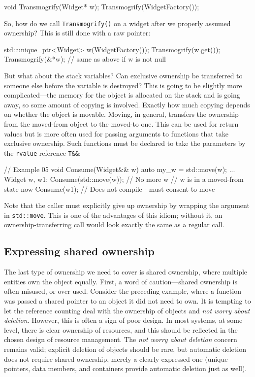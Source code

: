 \begin{code}
void Transmogrify(Widget* w);
Transmogrify(WidgetFactory());
\end{code}

So, how do we call \texttt{Transmogrify()} on a widget after we properly assumed ownership? This is still done with a raw pointer:

\begin{code}
std::unique_ptr<Widget> w(WidgetFactory());
Transmogrify(w.get());
Transmogrify(&*w);     // same as above if w is not null
\end{code}

But what about the stack variables? Can exclusive ownership be transferred to someone else before the variable is destroyed? This is going to be slightly more complicated---the memory for the object is allocated on the stack and is going away, so some amount of copying is involved. Exactly how much copying depends on whether the object is movable. Moving, in general, transfers the ownership from the moved-from object to the moved-to one. This can be used for return values but is more often used for passing arguments to functions that take exclusive ownership. Such functions must be declared to take the parameters by the \texttt{rvalue} reference \texttt{T\&\&}:

\begin{code}
// Example 05
void Consume(Widget&& w) {
  auto my_w = std::move(w);
    ...
}
Widget w, w1;
Consume(std::move(w));    // No more w
// w is in a moved-from state now
Consume(w1);    // Does not compile - must consent to move
\end{code}

Note that the caller must explicitly give up ownership by wrapping the argument in \texttt{std::move}. This is one of the advantages of this idiom; without it, an ownership-transferring call would look exactly the same as a regular call.

\subsection{Expressing shared ownership}

The last type of ownership we need to cover is shared ownership, where multiple entities own the object equally. First, a word of caution---shared ownership is often misused, or over-used. Consider the preceding example, where a function was passed a shared pointer to an object it did not need to own. It is tempting to let the reference counting deal with the ownership of objects and \emph{not worry about deletion}. However, this is often a sign of poor design. In most systems, at some level, there is clear ownership of resources, and this should be reflected in the chosen design of resource management. The \emph{not worry about deletion} concern remains valid; explicit deletion of objects should be rare, but automatic deletion does not require shared ownership, merely a clearly expressed one (unique pointers, data members, and containers provide automatic deletion just as well).

